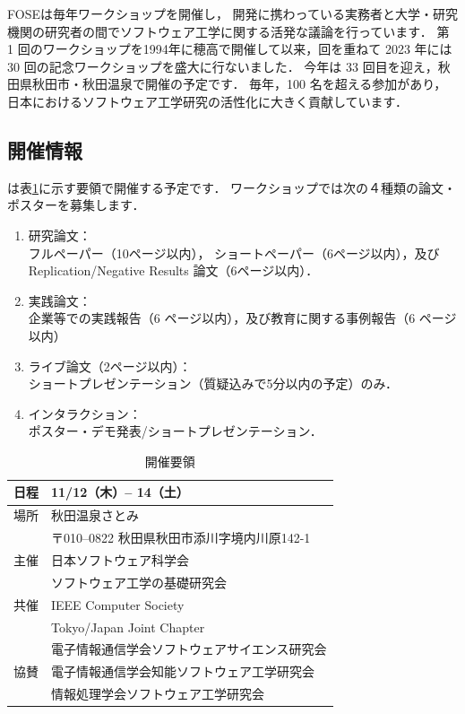 \documentclass[T,J]{fose} %
\begin{document}
FOSEは毎年ワークショップを開催し，
開発に携わっている実務者と大学・研究機関の研究者の間でソフトウェア工学に関する活発な議論を行っています．
第 1 回のワークショップを1994年に穂高で開催して以来，回を重ねて 2023 年には 30 回の記念ワークショップを盛大に行ないました．
今年は 33 回目を迎え，秋田県秋田市・秋田温泉で開催の予定です．
毎年，100 名を超える参加があり，日本におけるソフトウェア工学研究の活性化に大きく貢献しています．

\subsection{開催情報}
\foseabbrev\cite{fose2026}は表\ref{tbl:workshop}に示す要領で開催する予定です．
ワークショップでは次の４種類の論文・ポスターを募集します．

\begin{enumerate}
	\item 研究論文：\\
	フルペーパー（10ページ以内），
	ショートペーパー（6ページ以内），及び
	Replication/Negative Results 論文（6ページ以内）．
	\item 実践論文：\\
	企業等での実践報告（6 ページ以内），及び教育に関する事例報告（6 ページ以内）
	\item ライブ論文（2ページ以内）：\\
	ショートプレゼンテーション（質疑込みで5分以内の予定）のみ．
	\item インタラクション：\\
	ポスター・デモ発表/ショートプレゼンテーション．
\end{enumerate}

\begin{table}[b]
	\centering
	\caption{\foseabbrev 開催要領}
	\label{tbl:workshop}
	\small
	\doublerulesep=0.3pt
	\begin{tabular}{ll}\hline\hline\hline
		日程 & 11/12（木）-- 14（土）\\ \hline
		場所 & 秋田温泉さとみ \\
		 & 〒010--0822 秋田県秋田市添川字境内川原142-1 \\ \hline
		 主催 & 日本ソフトウェア科学会 \\
		 & ソフトウェア工学の基礎研究会 \\ \hline 
		 共催 & IEEE Computer Society \\
		 & Tokyo/Japan Joint Chapter \\ \hline
		 & 電子情報通信学会ソフトウェアサイエンス研究会 \\
		 協賛 & 電子情報通信学会知能ソフトウェア工学研究会 \\
		 & 情報処理学会ソフトウェア工学研究会 \\ \hline
	\end{tabular}
\end{table}
\end{document}

